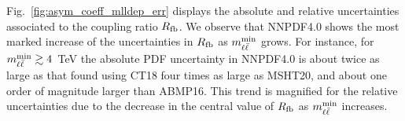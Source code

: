 Fig.~\ref{fig:asym_coeff_mlldep_err} displays the 
absolute  and relative  uncertainties
associated to the coupling ratio $R_{\rm fb}$.
%
We observe that NNPDF4.0 shows
the most marked increase of the uncertainties in $R_{\rm fb}$
as $m_{\ell\bar{\ell}}^{\rm min}$ grows.
%
For instance, for  $m_{\ell\bar{\ell}}^{\rm min}\gtrsim4$~TeV
the absolute PDF uncertainty in NNPDF4.0
is about twice as large as that found using CT18 
four times as large as MSHT20,
and about one order of magnitude larger than ABMP16.
%
This trend is magnified for the relative uncertainties
due to the decrease in the central value of $R_{\rm fb}$
as $m_{\ell\bar{\ell}}^{\rm min}$ increases.
